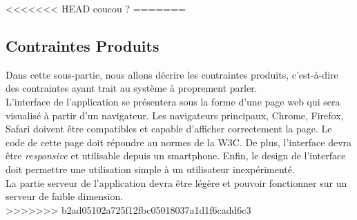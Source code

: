 <<<<<<< HEAD
coucou ?
=======
\subsection{Contraintes Produits}
Dans cette sous-partie, nous allons décrire les contraintes produits, c'est-à-dire des contraintes ayant trait au système à proprement parler.\\

L'interface de l'application se présentera sous la forme d'une page web qui sera visualisé à partir d'un navigateur. Les navigateurs principaux, Chrome, Firefox, Safari doivent être compatibles et capable d'afficher correctement la page. Le code de cette page doit répondre au normes de la W3C. De plus, l'interface devra être \emph{responsive} et utilisable depuis un smartphone. Enfin, le design de l'interface doit permettre une utilisation simple à un utilisateur inexpérimenté.\\

La partie serveur de l'application devra être légère et pouvoir fonctionner sur un serveur de faible dimension.\\
>>>>>>> b2ad05102a725f12fbc05018037a1d1f6cadd6c3
